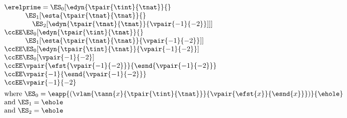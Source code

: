 $\begin{array}{l}
  \erelprime = \ES_0[\edyn{\tpair{\tint}{\tnat}}{}
\\\qquad\quad \ES_1[\esta{\tpair{\tnat}{\tnat}}{}
\\\qquad\quad\quad \ES_2[\edyn{\tpair{\tnat}{\tnat}}{\vpair{-1}{-2}}]]]
\\\ccEE \ES_0[\edyn{\tpair{\tint}{\tnat}}{}
\\\qquad\quad \ES_1[\esta{\tpair{\tnat}{\tnat}}{\vpair{-1}{-2}}]]
\\\ccEE \ES_0[\edyn{\tpair{\tint}{\tnat}}{\vpair{-1}{-2}}]
\\\ccEE \ES_0[\vpair{-1}{-2}]
\\\ccEE \vpair{\efst{\vpair{-1}{-2}}}{\esnd{\vpair{-1}{-2}}}
\\\ccEE \vpair{-1}{\esnd{\vpair{-1}{-2}}}
\\\ccEE \vpair{-1}{-2}
\\[1ex]
  \mbox{where } \ES_0 = \eapp{(\vlam{\tann{x}{\tpair{\tint}{\tnat}}}{\vpair{\efst{x}}{\esnd{x}}})}{\ehole}
\\\mbox{and } \ES_1 = \ehole
\\\mbox{and } \ES_2 = \ehole
\end{array}$
